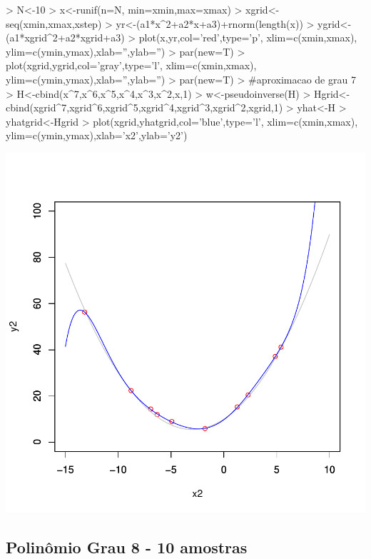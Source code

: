 \documentclass{article}
\begin{document}
\begin{Schunk}
\begin{Sinput}
>   N<-10
>   x<-runif(n=N, min=xmin,max=xmax)
>   xgrid<-seq(xmin,xmax,xstep)
>   yr<-(a1*x^2+a2*x+a3)+rnorm(length(x))
>   ygrid<-(a1*xgrid^2+a2*xgrid+a3)
>   plot(x,yr,col='red',type='p', xlim=c(xmin,xmax), ylim=c(ymin,ymax),xlab='',ylab='')
>   par(new=T)
>   plot(xgrid,ygrid,col='gray',type='l', xlim=c(xmin,xmax), ylim=c(ymin,ymax),xlab='',ylab='')
>   par(new=T)
>   #aproximacao de grau 7
>   H<-cbind(x^7,x^6,x^5,x^4,x^3,x^2,x,1)
>   w<-pseudoinverse(H) %
>   Hgrid<-cbind(xgrid^7,xgrid^6,xgrid^5,xgrid^4,xgrid^3,xgrid^2,xgrid,1)
>   yhat<-H%
>   yhatgrid<-Hgrid%
>   plot(xgrid,yhatgrid,col='blue',type='l', xlim=c(xmin,xmax), ylim=c(ymin,ymax),xlab='x2',ylab='y2')
\end{Sinput}
\end{Schunk}
\includegraphics{aproximacao_polinomial-008}

\newpage
\subsection{Polinômio Grau 8 - 10 amostras}
\end{document}
